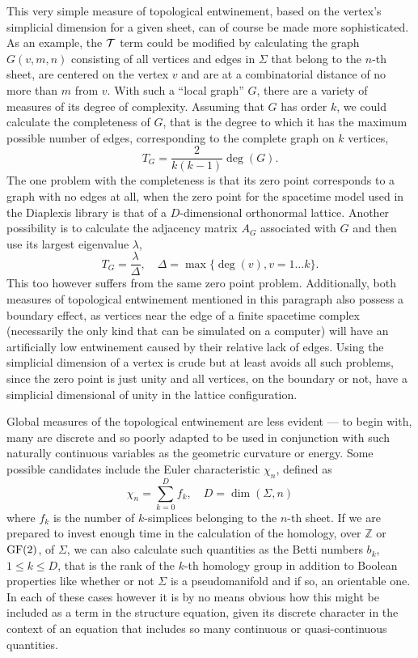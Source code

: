 \documentclass[12pt,letterpaper]{report}
\begin{document}
This very simple measure of topological entwinement, based on the vertex's simplicial dimension 
for a given sheet, can of course be made more sophisticated. As an example, the $\cal{T}$ term 
could be modified by calculating the graph $G(v,m,n)$ consisting of all vertices and edges in 
$\Sigma$ that belong to the $n$-th sheet, are centered on the vertex $v$ and are at a combinatorial 
distance of no more than $m$ from $v$. With such a ``local graph'' $G$, there are a variety of measures 
of its degree of complexity. Assuming that $G$ has order $k$, we could calculate the completeness of 
$G$, that is the degree to which it has the maximum possible number of edges, corresponding to the 
complete graph on $k$ vertices,
\begin{equation*}
T_G = \frac {2}{k(k-1)}\deg(G).
\end{equation*}
The one problem with the completeness is that its zero point corresponds to a graph with no edges at 
all, when the zero point for the spacetime model used in the Diaplexis library is that of a $D$-dimensional 
orthonormal lattice. Another possibility is to calculate the adjacency matrix $A_G$ associated with $G$ and 
then use its largest eigenvalue $\lambda$,
\begin{equation*}
T_G = \frac {\lambda}{\Delta}, \quad \Delta = \max \{\deg(v), v=1\dots k\}.
\end{equation*}
This too however suffers from the same zero point problem. Additionally, both measures of topological 
entwinement mentioned in this paragraph also possess a boundary effect, as vertices near the edge of a 
finite spacetime complex (necessarily the only kind that can be simulated on a computer) will have an 
artificially low entwinement caused by their relative lack of edges. Using the simplicial dimension of a 
vertex is crude but at least avoids all such problems, since the zero point is just unity and all vertices, 
on the boundary or not, have a simplicial dimensional of unity in the lattice configuration.       

Global measures of the topological entwinement are less evident --- to begin with, many are discrete and so 
poorly adapted to be used in conjunction with such naturally continuous variables as the geometric 
curvature or energy. Some possible candidates include the Euler characteristic $\chi_n$, defined as 
\begin{equation*}
\chi_n = \sum_{k=0}^D f_k, \quad D = \dim(\Sigma,n) 
\end{equation*}
where $f_k$ is the number of $k$-simplices belonging to the $n$-th sheet. If we are prepared to invest 
enough time in the calculation of the homology, over $\mathbb{Z}$ or $\textnormal{GF}(2)$, of $\Sigma$, 
we can also calculate such quantities as the Betti numbers $b_k$, $1\le k\le D$, that is the rank of the 
$k$-th homology group in addition to Boolean properties like whether or not $\Sigma$ is a pseudomanifold 
and if so, an orientable one. In each of these cases however it is by no means obvious how this might be 
included as a term in the structure equation, given its discrete character in the context of an equation 
that includes so many continuous or quasi-continuous quantities.    
  
\end{document}
